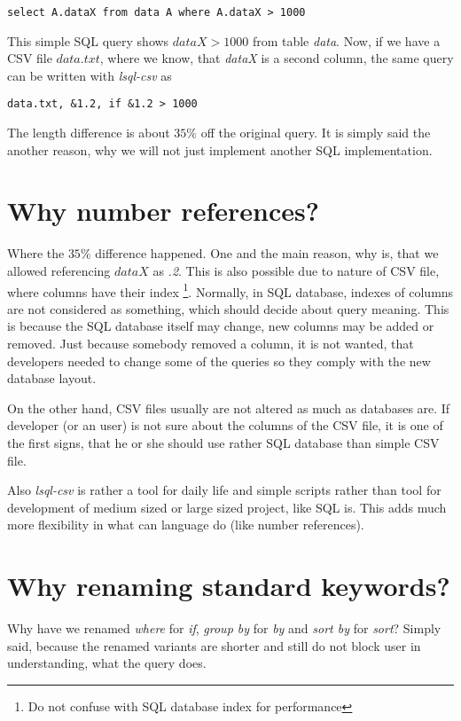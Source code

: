 \begin{verbatim}
select A.dataX from data A where A.dataX > 1000
\end{verbatim}

This simple SQL query shows $dataX > 1000$ from table \textit{data}. 
Now, if we have a CSV file $data.txt$, where we know, that \textit{dataX} is a second column, the same query can 
be written with \textit{lsql-csv} as

\begin{verbatim}
data.txt, &1.2, if &1.2 > 1000
\end{verbatim}

The length difference is about $35\%$ off the original query. It is simply said the another reason, 
why we will not just implement another SQL implementation.

\section{Why number references?}
Where the $35\%$ difference happened. One and the main reason, why is, that we allowed referencing $dataX$ as \textit{.2}.
This is also possible due to nature of CSV file, where columns have their index
\footnote{Do not confuse with SQL database index for performance}. 
Normally, in SQL database, indexes of columns are not considered as something, which should decide about query meaning.
This is because the SQL database itself may change, new columns may be added or removed. Just because somebody removed a column, 
it is not wanted, that developers needed to change some of the queries so they comply with the new database layout.

On the other hand, CSV files usually are not altered as much as databases are. 
If developer (or an user) is not sure about the columns of the CSV file, it is one of the first signs, that
he or she should use rather SQL database than simple CSV file.

Also \textit{lsql-csv} is rather a tool for daily life and simple scripts rather than tool for development of medium sized or
large sized project, like SQL is. This adds much more flexibility in what can language do (like number references).

\section{Why renaming standard keywords?}
Why have we renamed \textit{where} for \textit{if}, \textit{group by} for \textit{by} and \textit{sort by} for \textit{sort}? Simply said, because the renamed variants are shorter and still do not block user in understanding, what the query does.

